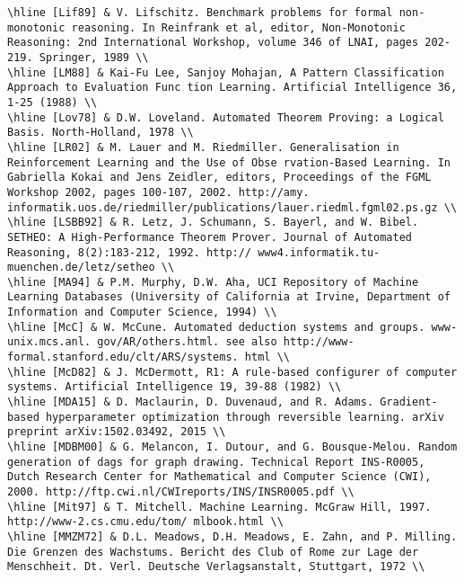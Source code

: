 \documentclass[10pt]{article}
\begin{document}
\begin{verbatim}
\hline [Lif89] & V. Lifschitz. Benchmark problems for formal non-monotonic reasoning. In Reinfrank et al, editor, Non-Monotonic Reasoning: 2nd International Workshop, volume 346 of LNAI, pages 202-219. Springer, 1989 \\
\hline [LM88] & Kai-Fu Lee, Sanjoy Mohajan, A Pattern Classification Approach to Evaluation Func tion Learning. Artificial Intelligence 36, 1-25 (1988) \\
\hline [Lov78] & D.W. Loveland. Automated Theorem Proving: a Logical Basis. North-Holland, 1978 \\
\hline [LR02] & M. Lauer and M. Riedmiller. Generalisation in Reinforcement Learning and the Use of Obse rvation-Based Learning. In Gabriella Kokai and Jens Zeidler, editors, Proceedings of the FGML Workshop 2002, pages 100-107, 2002. http://amy. informatik.uos.de/riedmiller/publications/lauer.riedml.fgml02.ps.gz \\
\hline [LSBB92] & R. Letz, J. Schumann, S. Bayerl, and W. Bibel. SETHEO: A High-Performance Theorem Prover. Journal of Automated Reasoning, 8(2):183-212, 1992. http:// www4.informatik.tu-muenchen.de/letz/setheo \\
\hline [MA94] & P.M. Murphy, D.W. Aha, UCI Repository of Machine Learning Databases (University of California at Irvine, Department of Information and Computer Science, 1994) \\
\hline [McC] & W. McCune. Automated deduction systems and groups. www-unix.mcs.anl. gov/AR/others.html. see also http://www-formal.stanford.edu/clt/ARS/systems. html \\
\hline [McD82] & J. McDermott, R1: A rule-based configurer of computer systems. Artificial Intelligence 19, 39-88 (1982) \\
\hline [MDA15] & D. Maclaurin, D. Duvenaud, and R. Adams. Gradient-based hyperparameter optimization through reversible learning. arXiv preprint arXiv:1502.03492, 2015 \\
\hline [MDBM00] & G. Melancon, I. Dutour, and G. Bousque-Melou. Random generation of dags for graph drawing. Technical Report INS-R0005, Dutch Research Center for Mathematical and Computer Science (CWI), 2000. http://ftp.cwi.nl/CWIreports/INS/INSR0005.pdf \\
\hline [Mit97] & T. Mitchell. Machine Learning. McGraw Hill, 1997. http://www-2.cs.cmu.edu/tom/ mlbook.html \\
\hline [MMZM72] & D.L. Meadows, D.H. Meadows, E. Zahn, and P. Milling. Die Grenzen des Wachstums. Bericht des Club of Rome zur Lage der Menschheit. Dt. Verl. Deutsche Verlagsanstalt, Stuttgart, 1972 \\

\end{verbatim}
\end{document}

